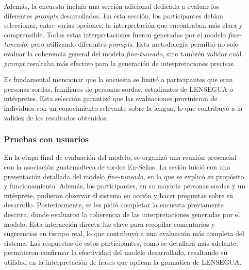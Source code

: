 Además, la encuesta incluía una sección adicional dedicada a evaluar los diferentes \textit{prompts} desarrollados. En esta sección, los participantes debían seleccionar, entre varias opciones, la interpretación que encontraban más clara y comprensible. Todas estas interpretaciones fueron generadas por el modelo \textit{fine-tuneado}, pero utilizando diferentes \textit{prompts}. Esta metodología permitió no solo evaluar la coherencia general del modelo \textit{fine-tuneado}, sino también validar cuál \textit{prompt} resultaba más efectivo para la generación de interpretaciones precisas.

Es fundamental mencionar que la encuesta se limitó a participantes que eran personas sordas, familiares de personas sordas, estudiantes de LENSEGUA o intérpretes. Esta selección garantizó que las evaluaciones provinieran de individuos con un conocimiento relevante sobre la lengua, lo que contribuyó a la validez de los resultados obtenidos.


\subsubsection{Pruebas con usuarios}

En la etapa final de evaluación del modelo, se organizó una reunión presencial con la asociación guatemalteca de sordos En-Señas. La sesión inició con una presentación detallada del modelo \textit{fine-tuneado}, en la que se explicó su propósito y funcionamiento. Además, los participantes, en su mayoría personas sordas y un intérprete, pudieron observar el sistema en acción y hacer preguntas sobre su desarrollo. Posteriormente, se les pidió completar la encuesta previamente descrita, donde evaluaron la coherencia de las interpretaciones generadas por el modelo. Esta interacción directa fue clave para recopilar comentarios y sugerencias en tiempo real, lo que contribuyó a una evaluación más completa del sistema. Las respuestas de estos participantes, como se detallará más adelante, permitieron confirmar la efectividad del modelo desarrollado, resaltando su utilidad en la interpretación de frases que aplican la gramática de LENSEGUA.

